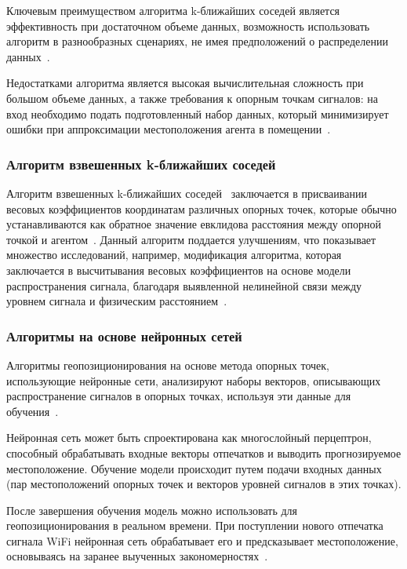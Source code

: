 Ключевым преимуществом алгоритма k-ближайших соседей является эффективность при достаточном объеме данных, возможность использовать алгоритм в разнообразных сценариях, не имея предположений о распределении данных~\cite{trends}.

Недостатками алгоритма является высокая вычислительная сложность при большом объеме данных, а также требования к опорным точкам сигналов: на вход необходимо подать подготовленный набор данных, который минимизирует ошибки при аппроксимации местоположения агента в помещении~\cite{android-analysis}.

\subsubsection{Алгоритм взвешенных k-ближайших соседей}

Алгоритм взвешенных k-ближайших соседей~\cite{gansemer2010improved} заключается в присваивании весовых коэффициентов координатам различных опорных точек, которые обычно устанавливаются как обратное значение евклидова расстояния между опорной точкой и агентом~\cite{wknn}. Данный алгоритм поддается улучшениям, что показывает множество исследований, например, модификация алгоритма, которая заключается в высчитывания весовых коэффициентов на основе модели распространения сигнала, благодаря выявленной нелинейной связи между уровнем сигнала и физическим расстоянием~\cite{mwknn}.

\subsubsection{Алгоритмы на основе нейронных сетей}

Алгоритмы геопозиционирования на основе метода опорных точек, использующие нейронные сети, анализируют наборы векторов, описывающих распространение сигналов в опорных точках, используя эти данные для обучения~\cite{neural-networks}. 

Нейронная сеть может быть спроектирована как многослойный перцептрон, способный обрабатывать входные векторы отпечатков и выводить прогнозируемое местоположение. Обучение модели происходит путем подачи входных данных (пар местоположений опорных точек и векторов уровней сигналов в этих точках).

После завершения обучения модель можно использовать для геопозиционирования в реальном времени. При поступлении нового отпечатка сигнала WiFi нейронная сеть обрабатывает его и предсказывает местоположение, основываясь на заранее выученных закономерностях~\cite{trends}.

